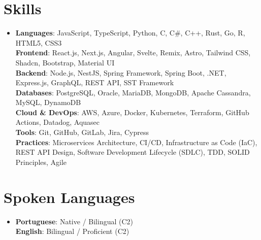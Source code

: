 \documentclass[letterpaper,11pt]{article}
\begin{document}
\section{Skills}
  \begin{itemize}[leftmargin=0.15in, label={}]
    \item\small{
      \textbf{Languages}: JavaScript, TypeScript, Python, C, C\#, C++, Rust, Go, R, HTML5, CSS3 \\
      \textbf{Frontend}: React.js, Next.js, Angular, Svelte, Remix, Astro, Tailwind CSS, Shadcn, Bootstrap, Material UI \\
      \textbf{Backend}: Node.js, NestJS, Spring Framework, Spring Boot, .NET, Express.js, GraphQL, REST API, SST Framework \\
      \textbf{Databases}: PostgreSQL, Oracle, MariaDB, MongoDB, Apache Cassandra, MySQL, DynamoDB \\
      \textbf{Cloud \& DevOps}: AWS, Azure, Docker, Kubernetes, Terraform, GitHub Actions, Datadog, Aquasec \\
      \textbf{Tools}: Git, GitHub, GitLab, Jira, Cypress \\
      \textbf{Practices}: Microservices Architecture, CI/CD, Infrastructure as Code (IaC), REST API Design, Software Development Lifecycle (SDLC), TDD, SOLID Principles, Agile
    }
  \end{itemize}


\section{Spoken Languages}
  \begin{itemize}[leftmargin=0.15in, label={}]
    \item\small{
      \textbf{Portuguese}: Native / Bilingual (C2) \\
      \textbf{English}: Bilingual / Proficient (C2)
    }
  \end{itemize}


\end{document}
